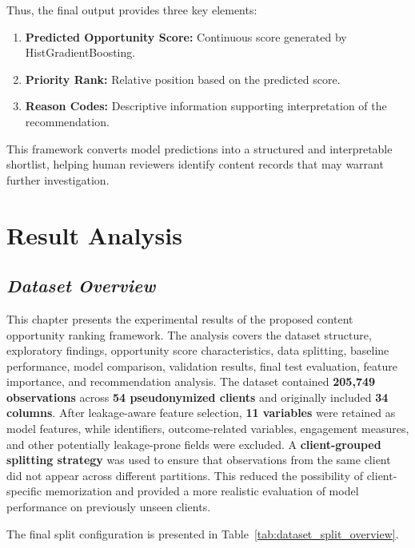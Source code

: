 \documentclass[12pt,a4paper]{report}
\begin{document}
Thus, the final output provides three key elements:

\begin{enumerate}
    \item \textbf{Predicted Opportunity Score:} Continuous score generated by HistGradientBoosting.
    \item \textbf{Priority Rank:} Relative position based on the predicted score.
    \item \textbf{Reason Codes:} Descriptive information supporting interpretation of the recommendation.
\end{enumerate}

This framework converts model predictions into a structured and interpretable shortlist, helping human reviewers identify content records that may warrant further investigation.
\chapter{Result Analysis}

\section{\textit{Dataset Overview}}

This chapter presents the experimental results of the proposed content opportunity ranking framework. The analysis covers the dataset structure, exploratory findings, opportunity score characteristics, data splitting, baseline performance, model comparison, validation results, final test evaluation, feature importance, and recommendation analysis. The dataset contained \textbf{205,749 observations} across \textbf{54 pseudonymized clients} and originally included \textbf{34 columns}. After leakage-aware feature selection, \textbf{11 variables} were retained as model features, while identifiers, outcome-related variables, engagement measures, and other potentially leakage-prone fields were excluded. A \textbf{client-grouped splitting strategy} was used to ensure that observations from the same client did not appear across different partitions. This reduced the possibility of client-specific memorization and provided a more realistic evaluation of model performance on previously unseen clients.

The final split configuration is presented in Table~\ref{tab:dataset_split_overview}.
\end{document}
